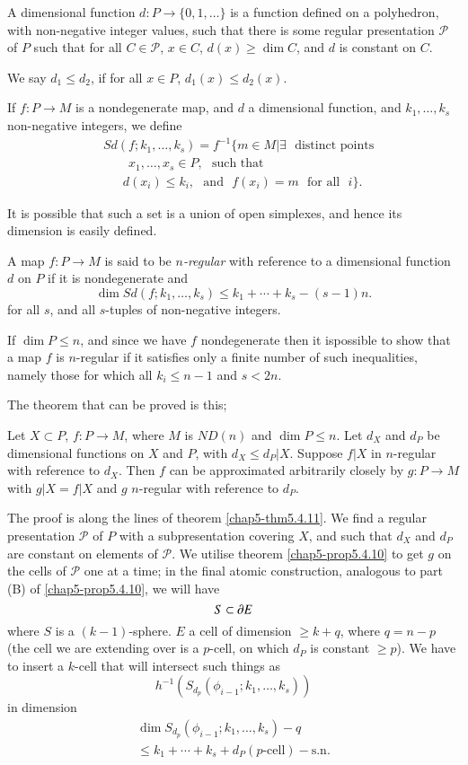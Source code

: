 A dimensional function $d:P\to \{0,1,\ldots\}$ is a function defined on a polyhedron, with non-negative integer values, such that there is some regular presentation $\mathscr{P}$ of $P$ such that for all $C\in \mathscr{P}$, $x\in C$, $d(x)\geq \dim C$, and $d$ is constant on $C$.

We say $d_{1}\leq d_{2}$, if for all $x\in P$, $d_{1}(x)\leq d_{2}(x)$.

If $f:P\to M$ is a nondegenerate map, and $d$ a dimensional function, and $k_{1},\ldots,k_{s}$ non-negative integers, we define
\begin{align*}
& Sd(f;k_{1},\ldots,k_{s})
 = f^{-1}\{m\in M|\exists \text{~ distinct points}\\
&\qquad x_{1},\ldots,x_{s}\in P,\text{~ such that}\\
&\quad\;\; d(x_{i})\leq k_{i},\text{~ and~ }f(x_{i})=m\text{~ for all~ } i\}. 
\end{align*}

It is possible that such a set is a union of open simplexes, and hence its dimension is easily defined.

A map $f:P\to M$ is said to be {\em $n$-regular} with reference to a dimensional function $d$ on $P$ if it is nondegenerate and 
$$
\dim Sd(f;k_{1},\ldots,k_{s})\leq k_{1}+\cdots+k_{s}-(s-1)n.
$$
for all $s$, and all $s$-tuples of non-negative integers.

If $\dim P\leq n$, and since we have $f$ nondegenerate then it is\pageoriginale possible to show that a map $f$ is $n$-regular if it satisfies only a finite number of such inequalities, namely those for which all $k_{i}\leq n-1$ and $s<2n$.

The theorem that can be proved is this;

\begin{theorem*}
Let $X\subset P$, $f:P\to M$, where $M$ is $ND(n)$ and $\dim P\leq n$. Let $d_{X}$ and $d_{P}$ be dimensional functions on $X$ and $P$, with $d_{X}\leq d_{P}|X$. Suppose $f|X$ in $n$-regular with reference to $d_{X}$. Then $f$ can be approximated arbitrarily closely by $g:P\to M$ with $g|X=f|X$ and $g$ $n$-regular with reference to $d_{P}$.
\end{theorem*}

The proof is along the lines of theorem \ref{chap5-thm5.4.11}. We find a regular presentation $\mathscr{P}$ of $P$ with a subpresentation covering $X$, and such that $d_{X}$ and $d_{P}$ are constant on elements of $\mathscr{P}$. We utilise theorem \ref{chap5-prop5.4.10} to get $g$ on the cells of $\mathscr{P}$ one at a time; in the final atomic construction, analogous to part (B) of \ref{chap5-prop5.4.10}, we will have
$$
S\subset \partial E
$$
where $S$ is a $(k-1)$-sphere. $E$ a cell of dimension $\geq k+q$, where $q=n-p$ (the cell we are extending over is a $p$-cell, on which $d_{P}$ is constant $\geq p$). We have to insert a $k$-cell that will intersect such things as
$$
h^{-1}(S_{d_{p}}(\phi_{i-1};k_{1},\ldots,k_{s}))
$$
in dimension
\begin{gather*}
\dim S_{d_{p}}(\phi_{i-1};k_{1},\ldots,k_{s})-q\\
\leq k_{1}+\cdots+k_{s}+d_{P}(p\text{-cell})-\text{s.n.}
\end{gather*}

